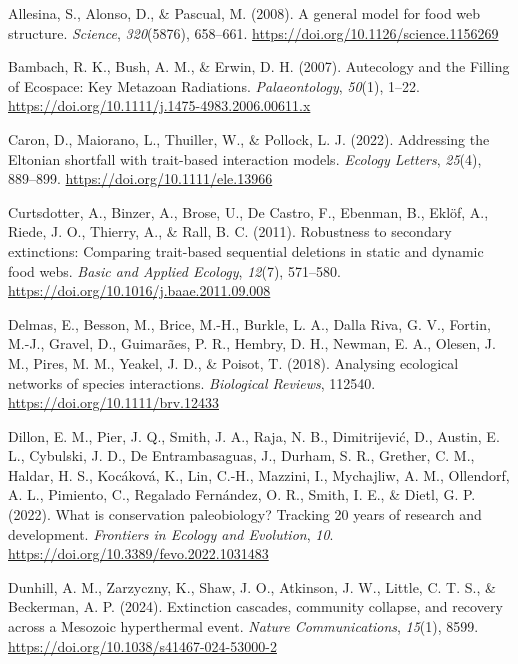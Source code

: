 \documentclass[
]{article}
\newlength{\cslhangindent}
\newenvironment{CSLReferences}[2] %
 {\begin{list}{}{%
  \setlength{\itemindent}{0pt}
  \setlength{\leftmargin}{0pt}
  \setlength{\parsep}{0pt}
  \ifodd #1
   \setlength{\leftmargin}{\cslhangindent}
   \setlength{\itemindent}{-1\cslhangindent}
  \fi
  \setlength{\itemsep}{#2\baselineskip}}}
 {\end{list}}
\begin{document}
\label{refs}
\begin{CSLReferences}{1}{0}
Allesina, S., Alonso, D., \& Pascual, M. (2008). A general model for
food web structure. \emph{Science}, \emph{320}(5876), 658--661.
\url{https://doi.org/10.1126/science.1156269}

Bambach, R. K., Bush, A. M., \& Erwin, D. H. (2007). Autecology and the
Filling of Ecospace: Key Metazoan Radiations. \emph{Palaeontology},
\emph{50}(1), 1--22.
\url{https://doi.org/10.1111/j.1475-4983.2006.00611.x}

Caron, D., Maiorano, L., Thuiller, W., \& Pollock, L. J. (2022).
Addressing the Eltonian shortfall with trait-based interaction models.
\emph{Ecology Letters}, \emph{25}(4), 889--899.
\url{https://doi.org/10.1111/ele.13966}

Curtsdotter, A., Binzer, A., Brose, U., De Castro, F., Ebenman, B.,
Eklöf, A., Riede, J. O., Thierry, A., \& Rall, B. C. (2011). Robustness
to secondary extinctions: Comparing trait-based sequential deletions in
static and dynamic food webs. \emph{Basic and Applied Ecology},
\emph{12}(7), 571--580. \url{https://doi.org/10.1016/j.baae.2011.09.008}

Delmas, E., Besson, M., Brice, M.-H., Burkle, L. A., Dalla Riva, G. V.,
Fortin, M.-J., Gravel, D., Guimarães, P. R., Hembry, D. H., Newman, E.
A., Olesen, J. M., Pires, M. M., Yeakel, J. D., \& Poisot, T. (2018).
Analysing ecological networks of species interactions. \emph{Biological
Reviews}, 112540. \url{https://doi.org/10.1111/brv.12433}

Dillon, E. M., Pier, J. Q., Smith, J. A., Raja, N. B., Dimitrijević, D.,
Austin, E. L., Cybulski, J. D., De Entrambasaguas, J., Durham, S. R.,
Grether, C. M., Haldar, H. S., Kocáková, K., Lin, C.-H., Mazzini, I.,
Mychajliw, A. M., Ollendorf, A. L., Pimiento, C., Regalado Fernández, O.
R., Smith, I. E., \& Dietl, G. P. (2022). What is conservation
paleobiology? Tracking 20 years of research and development.
\emph{Frontiers in Ecology and Evolution}, \emph{10}.
\url{https://doi.org/10.3389/fevo.2022.1031483}

Dunhill, A. M., Zarzyczny, K., Shaw, J. O., Atkinson, J. W., Little, C.
T. S., \& Beckerman, A. P. (2024). Extinction cascades, community
collapse, and recovery across a Mesozoic hyperthermal event.
\emph{Nature Communications}, \emph{15}(1), 8599.
\url{https://doi.org/10.1038/s41467-024-53000-2}


\end{CSLReferences}
\end{document}
